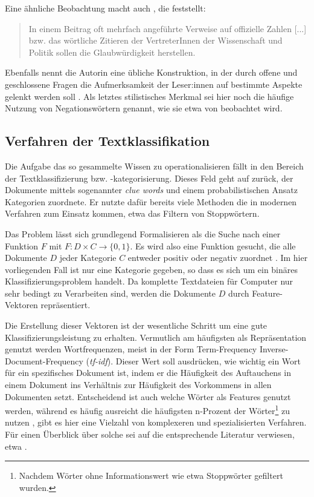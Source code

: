Eine ähnliche Beobachtung macht auch \textcite{filatkina_2018}, die feststellt:

\begin{quotation}
    In einem Beitrag oft mehrfach angeführte Verweise auf offizielle Zahlen [...] bzw. das wörtliche Zitieren der VertreterInnen der Wissenschaft und Politik sollen die Glaubwürdigkeit herstellen. \parencite[][208]{filatkina_2018}
\end{quotation}

Ebenfalls nennt die Autorin eine übliche Konstruktion, in der durch offene und geschlossene Fragen die Aufmerksamkeit der Leser:innen auf bestimmte Aspekte gelenkt werden soll \parencite[][205]{filatkina_2018}.
Als letztes stilistisches Merkmal sei hier noch die häufige Nutzung von Negationswörtern genannt, wie sie etwa von \textcite[149]{stumpf_2019} beobachtet wird.

\subsection{Verfahren der Textklassifikation}

Die Aufgabe das so gesammelte Wissen zu operationalisieren fällt in den Bereich der Textklassifizierung bzw. -kategorisierung.
Dieses Feld geht auf \textcite{maron_1961} zurück, der Dokumente mittels sogenannter \textit{clue words} und einem probabilistischen Ansatz Kategorien zuordnete.
Er nutzte dafür bereits viele Methoden die in modernen Verfahren zum Einsatz kommen, etwa das Filtern von Stoppwörtern.

Das Problem lässt sich grundlegend Formalisieren als die Suche nach einer Funktion $F$ mit $F : D \times C \rightarrow \{0, 1\}$.
Es wird also eine Funktion gesucht, die alle Dokumente $D$ jeder Kategorie $C$ entweder positiv oder negativ zuordnet \parencite[][66f]{feldman_sanger_2006}.
Im hier vorliegenden Fall ist nur eine Kategorie gegeben, so dass es sich um ein binäres Klassifizierungsproblem handelt.
Da komplette Textdateien für Computer nur sehr bedingt zu Verarbeiten sind, werden die Dokumente $D$ durch Feature-Vektoren repräsentiert.

Die Erstellung dieser Vektoren ist der wesentliche Schritt um eine gute Klassifizierungsleistung zu erhalten.
Vermutlich am häufigsten als Repräsentation genutzt werden Wortfrequenzen, meist in der Form Term-Frequency Inverse-Document-Frequency (\textit{tf-idf}).
Dieser Wert soll ausdrücken, wie wichtig ein Wort für ein spezifisches Dokument ist, indem er die Häufigkeit des Auftauchens in einem Dokument ins Verhältnis zur Häufigkeit des Vorkommens in allen Dokumenten setzt.
Entscheidend ist auch welche Wörter als Features genutzt werden, während es häufig ausreicht die häufigsten n-Prozent der Wörter\footnote{Nachdem Wörter ohne Informationswert wie etwa Stoppwörter gefiltert wurden.} zu nutzen \parencite[][68]{feldman_sanger_2006}, gibt es hier eine Vielzahl von komplexeren und spezialisierten Verfahren.
Für einen Überblick über solche sei auf die entsprechende Literatur verwiesen, etwa \textcite{yang_1997}.

